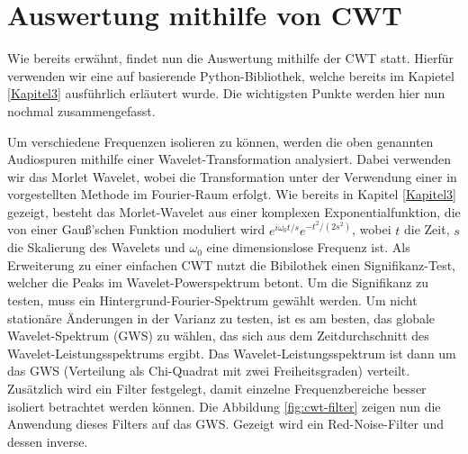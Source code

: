 \section{Auswertung mithilfe von CWT}
Wie bereits erwähnt, findet nun die Auswertung mithilfe der \ac{CWT} statt. Hierfür verwenden wir eine auf \cite{Torrence1998} basierende Python-Bibliothek, welche bereits im Kapietel \ref{Kapitel3} ausführlich erläutert wurde. Die wichtigsten Punkte werden hier nun nochmal zusammengefasst.

Um verschiedene Frequenzen isolieren zu können, werden die oben genannten Audiospuren mithilfe einer Wavelet-Transformation analysiert. Dabei verwenden wir das Morlet Wavelet, wobei die Transformation unter der Verwendung einer in \cite{Torrence1998} vorgestellten Methode im Fourier-Raum erfolgt. Wie bereits in Kapitel \ref{Kapitel3} gezeigt, besteht das Morlet-Wavelet aus einer komplexen Exponentialfunktion, die von einer Gauß'schen Funktion moduliert wird \(e^{i\omega_0 t/s}e^{-t^2/(2s^2)}\), wobei \(t\) die Zeit, \(s\) die Skalierung des Wavelets und \(\omega_0\) eine dimensionslose Frequenz ist. Als Erweiterung zu einer einfachen \ac{CWT} nutzt die Bibilothek einen Signifikanz-Test, welcher die Peaks im Wavelet-Powerspektrum betont. Um die Signifikanz zu testen, muss ein Hintergrund-Fourier-Spektrum gewählt werden. Um nicht stationäre Änderungen in der Varianz zu testen, ist es am besten, das globale Wavelet-Spektrum (GWS) zu wählen, das sich aus dem Zeitdurchschnitt des Wavelet-Leistungsspektrums ergibt. Das Wavelet-Leistungsspektrum ist dann um das GWS (Verteilung als Chi-Quadrat mit zwei Freiheitsgraden) verteilt. Zusätzlich wird ein Filter festgelegt, damit einzelne Frequenzbereiche besser isoliert betrachtet werden können. Die Abbildung \ref{fig:cwt-filter} zeigen nun die Anwendung dieses Filters auf das GWS. Gezeigt wird ein Red-Noise-Filter und dessen inverse.


